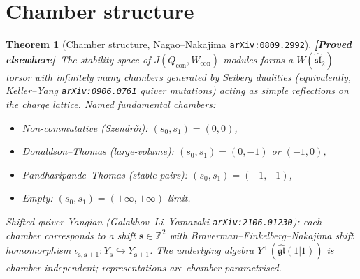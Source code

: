 \documentclass[11pt]{amsart}
\newtheorem{theorem}{Theorem}[section]
\theoremstyle{definition}
\providecommand{\bZ}{\mathbb{Z}}
\providecommand{\fgl}{\mathfrak{gl}}
\providecommand{\fsl}{\mathfrak{sl}}
\providecommand{\ClaimStatusProvedElsewhere}{\textbf{\textsf{[Proved elsewhere]}}}
\begin{document}
\section{Chamber structure}

\begin{theorem}[Chamber structure, Nagao--Nakajima \texttt{arXiv:0809.2992}]
\label{thm:chambers}
\ClaimStatusProvedElsewhere\
The stability space of $J(Q_{\mathrm{con}}, W_{\mathrm{con}})$-modules
forms a $W(\widehat{\fsl}_2)$-torsor with infinitely many chambers
generated by Seiberg dualities (equivalently, Keller--Yang
\texttt{arXiv:0906.0761} quiver mutations) acting as simple reflections
on the charge lattice. Named fundamental chambers:
\begin{itemize}[leftmargin=2em]
\item Non-commutative (Szendrői): $(s_0, s_1) = (0, 0)$,
\item Donaldson--Thomas (large-volume): $(s_0, s_1) = (0, -1)$ or $(-1, 0)$,
\item Pandharipande--Thomas (stable pairs): $(s_0, s_1) = (-1, -1)$,
\item Empty: $(s_0, s_1) = (+\infty, +\infty)$ limit.
\end{itemize}
Shifted quiver Yangian (Galakhov--Li--Yamazaki \texttt{arXiv:2106.01230}):
each chamber corresponds to a shift $\mathbf{s} \in \bZ^2$ with
Braverman--Finkelberg--Nakajima shift homomorphism
$\iota_{\mathbf{s}, \mathbf{s}+1} : Y_{\mathbf{s}} \hookrightarrow
Y_{\mathbf{s}+1}$. The underlying algebra $Y^+(\widehat{\fgl}(1|1))$ is
chamber-independent; representations are chamber-parametrised.
\end{theorem}
\end{document}
